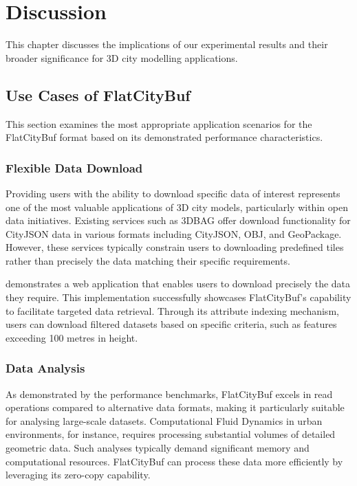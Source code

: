 \chapter{Discussion}
\label{chp:discussion}

This chapter discusses the implications of our experimental results and their broader significance for 3D city modelling applications.

\section{Use Cases of FlatCityBuf}
\label{use_case_flat_city_buffer}

This section examines the most appropriate application scenarios for the FlatCityBuf format based on its demonstrated performance characteristics.

\subsection{Flexible Data Download}
\label{flexible_data_download}

Providing users with the ability to download specific data of interest represents one of the most valuable applications of 3D city models, particularly within open data initiatives. Existing services such as 3DBAG offer download functionality for CityJSON data in various formats including CityJSON, OBJ, and GeoPackage. However, these services typically constrain users to downloading predefined tiles rather than precisely the data matching their specific requirements.

\citet{fcb-web-demo} demonstrates a web application that enables users to download precisely the data they require. This implementation successfully showcases FlatCityBuf's capability to facilitate targeted data retrieval. Through its attribute indexing mechanism, users can download filtered datasets based on specific criteria, such as features exceeding 100 metres in height.

\subsection{Data Analysis}
\label{data_analysis}
As demonstrated by the performance benchmarks, FlatCityBuf excels in read operations compared to alternative data formats, making it particularly suitable for analysing large-scale datasets. Computational Fluid Dynamics in urban environments, for instance, requires processing substantial volumes of detailed geometric data. Such analyses typically demand significant memory and computational resources. FlatCityBuf can process these data more efficiently by leveraging its zero-copy capability.

